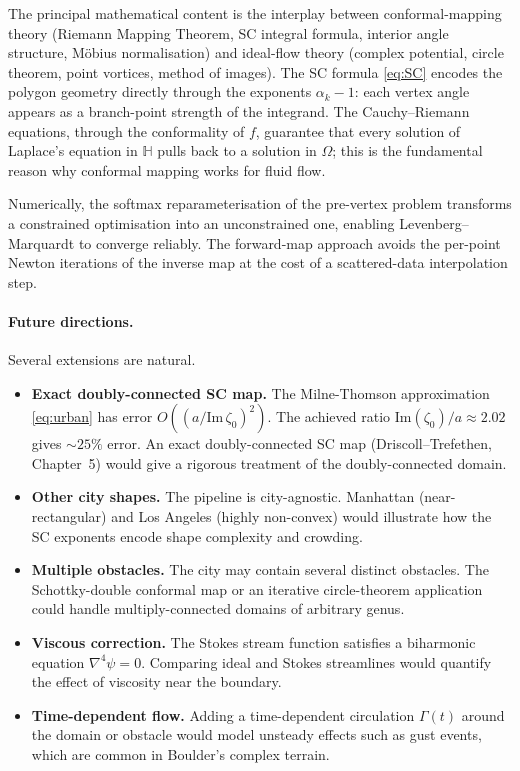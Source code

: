 \documentclass[11pt]{article}
\newcommand{\HH}{\mathbb{H}}          %
\newcommand{\Imag}{\mathrm{Im}}
\begin{document}
The principal mathematical content is the interplay between conformal-mapping
theory (Riemann Mapping Theorem, SC integral formula, interior angle structure,
M\"obius normalisation) and ideal-flow theory (complex potential, circle theorem,
point vortices, method of images). The SC formula \eqref{eq:SC} encodes the
polygon geometry directly through the exponents $\alpha_k-1$: each vertex angle
appears as a branch-point strength of the integrand. The Cauchy--Riemann equations,
through the conformality of $f$, guarantee that every solution of Laplace's
equation in $\HH$ pulls back to a solution in $\Omega$; this is the fundamental
reason why conformal mapping works for fluid flow.

Numerically, the softmax reparameterisation of the pre-vertex problem transforms
a constrained optimisation into an unconstrained one, enabling Levenberg--Marquardt
to converge reliably. The forward-map approach avoids the per-point Newton iterations
of the inverse map at the cost of a scattered-data interpolation step.

\paragraph{Future directions.}
Several extensions are natural.

\begin{itemize}[leftmargin=2em]

\item \textbf{Exact doubly-connected SC map.} The Milne-Thomson approximation
  \eqref{eq:urban} has error $O((a/\Imag\,\zeta_0)^2)$. The achieved ratio
  $\Imag(\zeta_0)/a\approx2.02$ gives $\sim\!25\%$ error. An exact doubly-connected
  SC map (Driscoll--Trefethen, Chapter~5) would give a rigorous treatment
  of the doubly-connected domain.

\item \textbf{Other city shapes.} The pipeline is city-agnostic.
  Manhattan (near-rectangular) and Los Angeles (highly non-convex) would
  illustrate how the SC exponents encode shape complexity and crowding.

\item \textbf{Multiple obstacles.} The city may contain several distinct
  obstacles. The Schottky-double conformal map or an iterative circle-theorem
  application could handle multiply-connected domains of arbitrary genus.

\item \textbf{Viscous correction.} The Stokes stream function satisfies a
  biharmonic equation $\nabla^4\psi=0$. Comparing ideal and Stokes streamlines
  would quantify the effect of viscosity near the boundary.

\item \textbf{Time-dependent flow.} Adding a time-dependent circulation
  $\Gamma(t)$ around the domain or obstacle would model unsteady effects
  such as gust events, which are common in Boulder's complex terrain.

\end{itemize}
\end{document}
